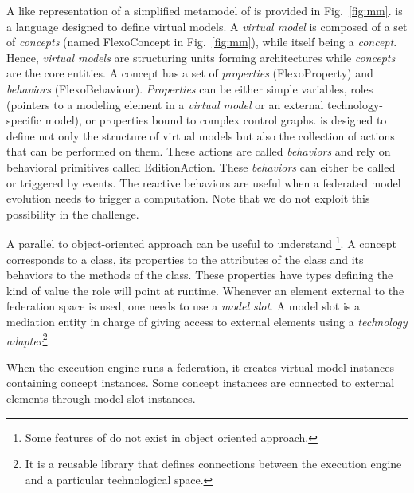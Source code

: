 A \UML like representation of a simplified metamodel of \FML is provided in
Fig.~\ref{fig:mm}. \FML is a language designed to define virtual models. A
\emph{virtual model} is composed of a set of \emph{concepts} (named
\textsf{FlexoConcept} in Fig.~\ref{fig:mm}), while itself being a
\emph{concept}. Hence, \emph{virtual models} are structuring units forming
architectures while \emph{concepts} are the core entities. A concept has a set
of \emph{properties} (\textsf{FlexoProperty}) and \emph{behaviors}
(\textsf{FlexoBehaviour}). \emph{Properties} can be either simple variables,
roles (pointers to a modeling element in a \emph{virtual model} or an external
technology-specific model), or properties bound to complex control graphs. \FML
is designed to define not only the structure of virtual models but also the
collection of actions that can be performed on them. These actions are called
\emph{behaviors} and rely on behavioral primitives called
\textsf{EditionAction}. These \emph{behaviors} can either be called or
triggered by events. The reactive behaviors are useful when a federated model
evolution needs to trigger a computation. Note that we do not exploit this
possibility in the challenge.

A parallel to object-oriented approach can be useful to understand
\FML\footnote{Some features of \FML do not exist in object oriented
approach.}\!.  A concept corresponds to a class, its properties to the
attributes of the class and its behaviors to the methods of the class. These
properties have types defining the kind of value the role will point at
runtime. Whenever an element external to the federation space is used, one
needs to use a \emph{model slot}.  A model slot is a mediation entity in charge
of giving access to external elements using a \emph{technology
adapter}\footnote{It is a reusable library that defines connections between the
\FML execution engine and a particular technological space.}.

When the \FML execution engine runs a federation, it creates virtual
model instances containing concept instances. Some concept instances
are connected to external elements through model slot instances.




